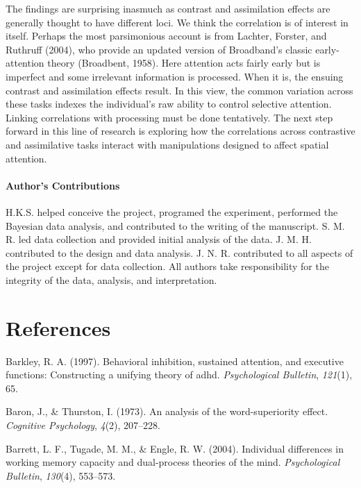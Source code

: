 \documentclass[english,floatsintext,man]{apa6}
\newcounter{author}
\theoremstyle{definition}
\theoremstyle{definition}
\theoremstyle{remark}
\begin{document}
The findings are surprising inasmuch as contrast and assimilation
effects are generally thought to have different loci. We think the
correlation is of interest in itself. Perhaps the most parsimonious
account is from Lachter, Forster, and Ruthruff (2004), who provide an
updated version of Broadband's classic early-attention theory
(Broadbent, 1958). Here attention acts fairly early but is imperfect and
some irrelevant information is processed. When it is, the ensuing
contrast and assimilation effects result. In this view, the common
variation across these tasks indexes the individual's raw ability to
control selective attention. Linking correlations with processing must
be done tentatively. The next step forward in this line of research is
exploring how the correlations across contrastive and assimilative tasks
interact with manipulations designed to affect spatial attention.

\paragraph{Author's Contributions}\label{authors-contributions}

H.K.S. helped conceive the project, programed the experiment, performed
the Bayesian data analysis, and contributed to the writing of the
manuscript. S. M. R. led data collection and provided initial analysis
of the data. J. M. H. contributed to the design and data analysis. J. N.
R. contributed to all aspects of the project except for data collection.
All authors take responsibility for the integrity of the data, analysis,
and interpretation.

\newpage

\section{References}\label{references}

\setlength{\parindent}{-0.5in} \setlength{\leftskip}{0.5in}

\hypertarget{refs}{}
\hypertarget{ref-Barkley:1997}{}
Barkley, R. A. (1997). Behavioral inhibition, sustained attention, and
executive functions: Constructing a unifying theory of adhd.
\emph{Psychological Bulletin}, \emph{121}(1), 65.

\hypertarget{ref-Baron:Thurston:1973}{}
Baron, J., \& Thurston, I. (1973). An analysis of the word-superiority
effect. \emph{Cognitive Psychology}, \emph{4}(2), 207--228.

\hypertarget{ref-Barrett:etal:2004}{}
Barrett, L. F., Tugade, M. M., \& Engle, R. W. (2004). Individual
differences in working memory capacity and dual-process theories of the
mind. \emph{Psychological Bulletin}, \emph{130}(4), 553--573.
\end{document}
